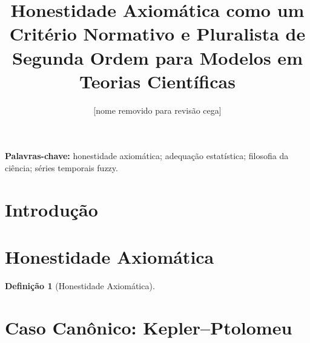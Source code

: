 \documentclass[12pt,a4paper]{article}
\title{Honestidade Axiomática como um Critério Normativo e Pluralista de Segunda Ordem para Modelos em Teorias Científicas}
\author{[nome removido para revisão cega]}
\date{}
\theoremstyle{definition}
\newtheorem{definition}{Definição}[section]
\theoremstyle{plain}
\theoremstyle{remark}
\begin{document}
	\maketitle
	
	\begin{abstract}
	\end{abstract}
	
	\begin{abstract}
	\end{abstract}
	
	\noindent\textbf{Palavras-chave:} honestidade axiomática; adequação estatística; filosofia da ciência; séries temporais fuzzy.
	
	\section{Introdução}
	
	
	
	
	\section{Honestidade Axiomática}
	
	\begin{definition}[Honestidade Axiomática]
		
	\end{definition}
	
	
	\section{Caso Canônico: Kepler--Ptolomeu}
	
\end{document}
